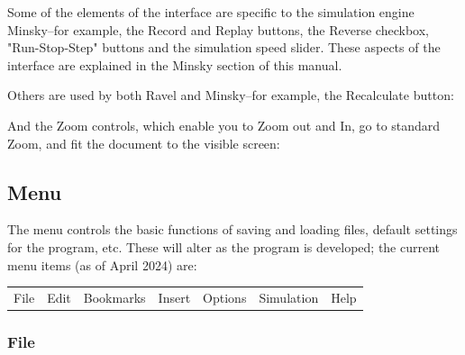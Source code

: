 Some of the elements of the interface are specific to the simulation engine Minsky--for example, the Record and Replay buttons, the Reverse checkbox, "Run-Stop-Step" buttons and the simulation speed slider. These aspects of the interface are explained in the Minsky section of this manual.


Others are used by both Ravel and Minsky--for example, the Recalculate button:


And the Zoom controls, which enable you to Zoom out and In, go to standard Zoom, and fit the document to the visible screen:


\subsection{Menu}
\label{Menu}

The menu controls the basic functions of saving and loading files, default settings for the program, etc. These will alter as the program is developed; the current menu items (as of April 2024) are: 

  \begin{tabular}{lllllll}
    File & Edit & Bookmarks & Insert & Options & Simulation & Help \\
  \end{tabular}

\subsubsection{File}
\label{File}

